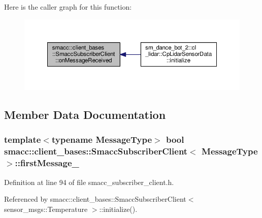 Here is the caller graph for this function\+:\nopagebreak
\begin{figure}[H]
\begin{center}
\leavevmode
\includegraphics[width=350pt]{classsmacc_1_1client__bases_1_1SmaccSubscriberClient_a4f02251e3a161fb6d802b154b1081f18_icgraph}
\end{center}
\end{figure}




\subsection{Member Data Documentation}
\subsubsection[{\texorpdfstring{first\+Message\+\_\+}{firstMessage_}}]{\setlength{\rightskip}{0pt plus 5cm}template$<$typename Message\+Type$>$ {\bf bool} {\bf smacc\+::client\+\_\+bases\+::\+Smacc\+Subscriber\+Client}$<$ Message\+Type $>$\+::first\+Message\+\_\+\hspace{0.3cm}{\ttfamily [private]}}\hypertarget{classsmacc_1_1client__bases_1_1SmaccSubscriberClient_a1283e89a0d33a9028a5042519c6869a6}{}\label{classsmacc_1_1client__bases_1_1SmaccSubscriberClient_a1283e89a0d33a9028a5042519c6869a6}


Definition at line 94 of file smacc\+\_\+subscriber\+\_\+client.\+h.



Referenced by smacc\+::client\+\_\+bases\+::\+Smacc\+Subscriber\+Client$<$ sensor\+\_\+msgs\+::\+Temperature $>$\+::initialize().

